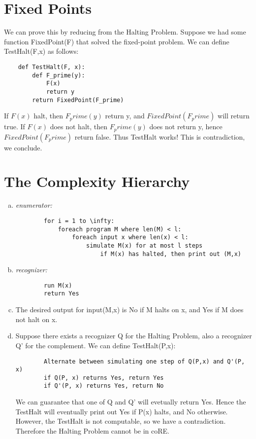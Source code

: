 \documentclass{article}
\begin{document}
\part*{Fixed Points}
We can prove this by reducing from the Halting Problem. 
Suppose we had some function FixedPoint(F) 
that solved the fixed-point problem. 
We can define TestHalt(F,x) as follows:
\begin{lstlisting}
    def TestHalt(F, x):
        def F_prime(y):
            F(x)
            return y
        return FixedPoint(F_prime)
\end{lstlisting}

If $F(x)$ halt, then $F_prime(y)$ return y, and $FixedPoint(F_prime)$ 
will return true. If $F(x)$ does not halt, then $F_prime(y)$ does not 
return y, hence $FixedPoint(F_prime)$ return false. Thus TestHalt 
works! This is contradiction, we conclude.


\part*{The Complexity Hierarchy}
\begin{enumerate}[(a).]
    \item 
    \emph{enumerator:}
    \begin{lstlisting}
        for i = 1 to \infty:
            foreach program M where len(M) < l:
                foreach input x where len(x) < l:
                    simulate M(x) for at most l steps
                        if M(x) has halted, then print out (M,x)
    \end{lstlisting}
    
    \item 
    \emph{recognizer:}
    \begin{lstlisting}
        run M(x)
        return Yes
    \end{lstlisting}

    \item 
    The desired output for input(M,x) is No if M halts on x, 
    and Yes if M does not halt on x.

    \item 
    Suppose there exists a recognizer Q for the Halting Problem, 
    also a recognizer Q' for the complement. We can define TestHalt(P,x): 
    \begin{lstlisting}
        Alternate between simulating one step of Q(P,x) and Q'(P, x)
        if Q(P, x) returns Yes, return Yes
        if Q'(P, x) returns Yes, return No
    \end{lstlisting}
    We can guarantee that one of Q and Q' will evetually return Yes. 
    Hence the TestHalt will eventually print out Yes if P(x) halts, and No otherwise. 
    However, the TestHalt is not computable, so we have a contradiction. 
    Therefore the Halting Problem cannot be in coRE.
\end{enumerate}
\end{document}
